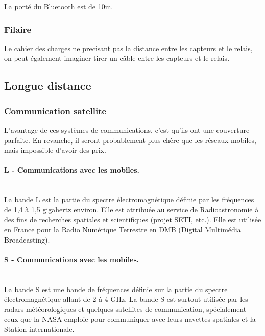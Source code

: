             La porté du Bluetooth est de 10m.
            
        \subsubsection{Filaire}
            Le cahier des charges ne precisant pas la distance entre les capteurs et le relais, on peut également imaginer tirer un câble entre les capteurs et le relais.
            

\subsection{Longue distance}

    \subsubsection{Communication satellite}

        L'avantage de ces systèmes de communications, c'est qu'ils ont une couverture parfaite.
        En revanche, il seront probablement plus chère que les réseaux mobiles, mais impossible d'avoir des prix.

        \paragraph{L - Communications avec les mobiles.}\\
            La bande L est la partie du spectre électromagnétique définie par les fréquences de 1,4 à 1,5 gigahertz environ. Elle est attribuée au service de Radioastronomie à des fins de recherches spatiales et scientifiques (projet SETI, etc.). Elle est utilisée en France pour la Radio Numérique Terrestre en DMB (Digital Multimédia Broadcasting).

        \paragraph{S - Communications avec les mobiles.}\\
            La bande S est une bande de fréquences définie sur la partie du spectre électromagnétique allant de 2 à 4 GHz.
            La bande S est surtout utilisée par les radars météorologiques et quelques satellites de communication, spécialement ceux que la NASA emploie pour communiquer avec leurs navettes spatiales et la Station internationale.

